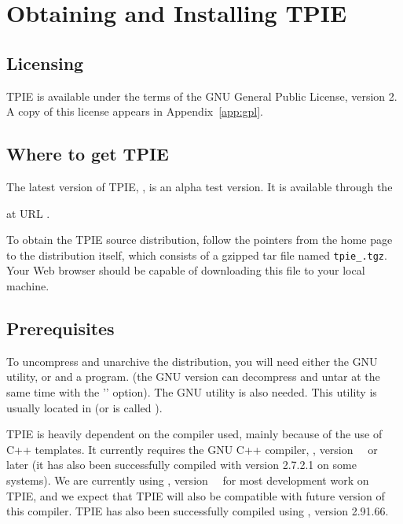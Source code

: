 \chapter{Obtaining and Installing TPIE}

\section{Licensing}

TPIE is available under the terms of the GNU General Public License,
 version 2.  A copy of this license appears in
Appendix~\ref{app:gpl}.

\section{Where to get TPIE}

The latest version of TPIE, \version, is an alpha test version.  It is
available through the %
\begin{latexonly}
at URL .
\end{latexonly}
To obtain the TPIE source distribution, follow
the pointers from the home page to the distribution itself, which consists
of a gzipped tar file named {\tt tpie\_\version.tgz}. Your Web browser
should be capable of downloading this file to your local machine.


\section{Prerequisites}

To uncompress and unarchive the distribution, you will need either the GNU
 utility, or  and a  program. (the GNU
version can decompress and untar at the same time with the ''
option). The GNU  utility is also needed. This utility is
usually located in  (or is called
).

TPIE is heavily dependent on the compiler used, mainly
because of the use of C++ templates. It currently requires
the GNU C++ compiler, , version~\gxxversion~ or
later (it has also been successfully compiled with
 version 2.7.2.1 on some systems). We are
currently using , version~\gxxcurrent~ for most
development work on TPIE, and we expect that TPIE will also be
compatible with future version of this compiler. TPIE has
also been successfully compiled using , version
2.91.66.

